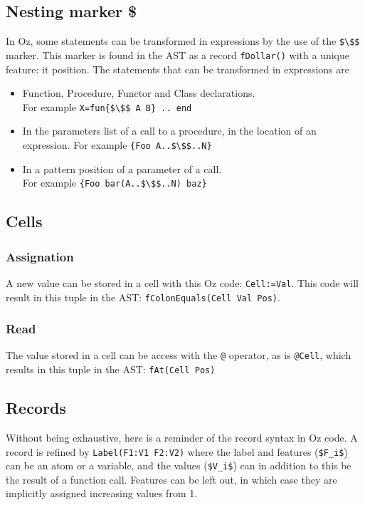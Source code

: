 \documentclass[a4paper]{memoir}
\begin{document}
\subsection{Nesting marker \$}\label{sec:input:nestingmarker}
In Oz, some statements can be transformed in expressions by the use of the
\lstinline[mathescape]!$\$$!
marker. This marker is found in the AST as a record \lstinline!fDollar()! with a unique
feature: it position.
The statements that can be transformed in expressions are
\begin{itemize}
  \item Function, Procedure, Functor and Class declarations. \\For example
    \lstinline[mathescape]!X=fun{$\$$ A B} .. end!
  \item In the parameters list of a call to a procedure, in the location of an
    expression. For example \lstinline[mathescape]!{Foo A..$\$$..N}!
  \item In a pattern position of a parameter of a call. \\For example
    \lstinline[mathescape]!{Foo bar(A..$\$$..N) baz}!
\end{itemize}

\subsection{Cells}\label{sec:input:cells}
\subsubsection{Assignation}
A new value can be stored in a cell with this Oz code: \lstinline!Cell:=Val!. This code will result in 
this tuple in the AST: \lstinline!fColonEquals(Cell Val Pos)!. %
\subsubsection{Read}
The value stored in a cell can be access with the \lstinline!@! operator, as is
\lstinline!@Cell!, which results in this tuple in the AST: 
\lstinline!fAt(Cell Pos)!
\subsection{Records}\label{sec:input:records}
Without being exhaustive, here is a reminder of the record syntax in Oz code. A
record is refined by \lstinline!Label(F1:V1 F2:V2)! where the label and features
(\lstinline[mathescape]!$F_i$!) can be an atom or a variable, and the values
(\lstinline[mathescape]!$V_i$!) can in addition to this be the result of a function call. Features can be left out, in which case they are implicitly assigned increasing values from 1.
\end{document}

